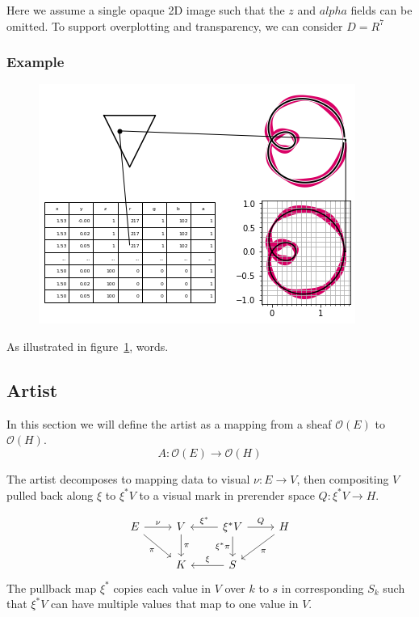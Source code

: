 \documentclass[../main.tex]{subfiles}
\begin{document}
Here we assume a single opaque 2D image such that the $z$ and $alpha$ fields can be omitted. To support overplotting and transparency, we can consider $D=R^{7}$

\subsubsection{{Example}}
\begin{figure}[H]
    \includegraphics[width=.4\linewidth]{figures/math/render.png}
    \caption{}
    \label{fig:render}
\end{figure}

As illustrated in figure~\ref{fig:render}, words.

\subsection{Artist}
\label{sec:artist}

In this section we will define the artist as a mapping from a sheaf $\mathcal{O}(E)$  to $\mathcal{O}(H)$. 
\begin{equation}
    A: \mathcal{O}(E) \rightarrow \mathcal{O}(H)
\end{equation}

The artist decomposes to mapping data to visual $\nu:E\rightarrow V$, then  compositing $V$ pulled back along $\xi$ to $\xi^*V$ to a visual mark in prerender space $Q:\xi^*V\rightarrow H$. 

\begin{equation}
    \label{eq:artist_diagram}
    \begin{tikzcd}
        E \arrow[r, "\nu"] \arrow[rd, "\pi"'] & V \arrow[d, "\pi"] & \xi^*V \arrow[r, "Q"] \arrow[d, "\xi^*\pi"'] \arrow[l, "\xi^*"'] & H \arrow[ld, "\pi"] \\
                                              & K                  & S \arrow[l, "\xi"']                                              &                    
        \end{tikzcd}
\end{equation}
The pullback map $\xi^*$ copies each value in $V$ over $k$ to $s$ in corresponding $S_k$ such that $\xi^*V$ can have multiple values that map to one value in $V$. 
\end{document}
